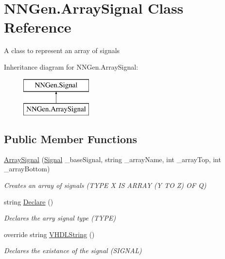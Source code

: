 \hypertarget{class_n_n_gen_1_1_array_signal}{}\section{N\+N\+Gen.\+Array\+Signal Class Reference}
\label{class_n_n_gen_1_1_array_signal}


A class to represent an array of signals  


Inheritance diagram for N\+N\+Gen.\+Array\+Signal\+:\begin{figure}[H]
\begin{center}
\leavevmode
\includegraphics[height=2.000000cm]{class_n_n_gen_1_1_array_signal}
\end{center}
\end{figure}
\subsection*{Public Member Functions}
\begin{DoxyCompactItemize}
\item 
\hyperlink{class_n_n_gen_1_1_array_signal_aee5e895b62756957e013e2993b39ca63}{Array\+Signal} (\hyperlink{class_n_n_gen_1_1_signal}{Signal} \+\_\+base\+Signal, string \+\_\+array\+Name, int \+\_\+array\+Top, int \+\_\+array\+Bottom)
\begin{DoxyCompactList}\small\item\em Creates an array of signals (T\+Y\+P\+E X I\+S A\+R\+R\+A\+Y (Y T\+O Z) O\+F Q) \end{DoxyCompactList}\item 
string \hyperlink{class_n_n_gen_1_1_array_signal_a818715a1024820c7707d338bfcd0f17c}{Declare} ()
\begin{DoxyCompactList}\small\item\em Declares the arry signal type (T\+Y\+P\+E) \end{DoxyCompactList}\item 
override string \hyperlink{class_n_n_gen_1_1_array_signal_a2fa5704a3963a12c2bb188520681a9e6}{V\+H\+D\+L\+String} ()
\begin{DoxyCompactList}\small\item\em Declares the existance of the signal (S\+I\+G\+N\+A\+L) \end{DoxyCompactList}\end{DoxyCompactItemize}
